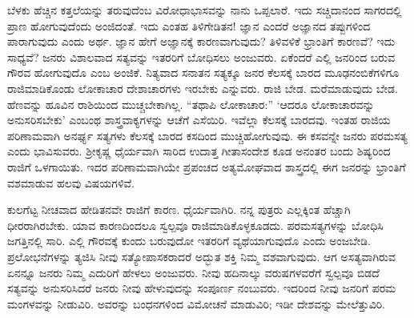 ಬೆಳಕು ಹೆಚ್ಚಿನ ಕತ್ತಲೆಯನ್ನು ತರುವುದೆಂಬ ವಿರೋಧಾಭಾಸವನ್ನು ನಾನು ಒಪ್ಪಲಾರೆ. ಇದು ಸಚ್ಚಿದಾನಂದ ಸಾಗರದಲ್ಲಿ ಪ್ರಾಣ ಹೋಗುವುದೆಂದು ಅಂಜಿದಂತೆ. ಇದು ಎಂತಹ ತಿಳಿಗೇಡಿತನ! ಜ್ಞಾನ ಎಂದರೆ ಅಜ್ಞಾನದ ತಪ್ಪುಗಳಿಂದ ಪಾರಾಗುವುದು ಎಂದು ಅರ್ಥ. ಜ್ಞಾನ ಹೇಗೆ ಅಜ್ಞಾನಕ್ಕೆ ಕಾರಣವಾಗುವುದು? ತಿಳಿವಳಿಕೆ ಭ್ರಾಂತಿಗೆ ಕಾರಣವೆ? ಇದು ಸಾಧ್ಯವೆ? ಜನರು ವಿಶಾಲವಾದ ಸತ್ಯವನ್ನು ಇತರರಿಗೆ ಬೋಧಿಸಲು ಅಂಜುವರು. ಏಕೆಂದರೆ ಎಲ್ಲಿ ಜನರಿಂದ ಬರುವ ಗೌರವ ಹೋಗುವುದೊ ಎಂಬ ಅಂಜಿಕೆ. ನಿತ್ಯವಾದ ಸನಾತನ ಸತ್ಯಕ್ಕೂ ಜನರ ಕೆಲಸಕ್ಕೆ ಬಾರದ ಮೂಢನಂಬಿಕೆಗಳಿಗೂ ರಾಜಿಮಾಡಿಕೊಂಡು ಲೋಕಾಚಾರ ದೇಶಾಚಾರಗಳು ಇರಬೇಕು ಎನ್ನುವರು. ರಾಜಿ ಬೇಡ. ಮರೆಮಾಡುವುದು ಬೇಡ. ಹೆಣವನ್ನು ಹೂವಿನ ರಾಶಿಯಿಂದ ಮುಚ್ಚಬೇಕಾಗಿಲ್ಲ. “ತಥಾಪಿ ಲೋಕಾಚಾರ:” ‘ಆದರೂ ಲೋಕಾಚಾರವನ್ನು ಅನುಸರಿಸಬೇಕು’ ಎಂಬಂಥ ಶಾಸ್ತ್ರವಾಕ್ಯಗಳನ್ನು ಆಚೆಗೆ ಎಸೆಯಿರಿ. ಇವೆಲ್ಲಾ ಕೆಲಸಕ್ಕೆ ಬಾರದವು. ಇಂತಹ ರಾಜಿಯ ಪರಿಣಾಮವಾಗಿ ಅನರ್ಘ್ಯ ಸತ್ಯಗಳು ಕೆಲಸಕ್ಕೆ ಬಾರದ ಕಸದಿಂದ ಮುಚ್ಚಿಹೋಗುವುವು. ಈ ಕಸವನ್ನೇ ಜನರು ಪರಮಸತ್ಯ ಎಂದು ಭಾವಿಸುವರು. ಶ‍್ರೀಕೃಷ್ಣ ಧೈರ್ಯವಾಗಿ ಸಾರಿದ ಉದಾತ್ತ ಗೀತಾಸಂದೇಶ ಕೂಡ ಅನಂತರ ಬಂದು ಶಿಷ್ಯರಿಂದ ರಾಜಿಗೆ ಒಳಗಾಯಿತು. ಇದರ ಪರಿಣಾಮವಾಗಿಯೇ ಪ್ರಪಂಚದ ಅತ್ಯಮೋಘವಾದ ಶಾಸ್ತ್ರದಲ್ಲಿ ಈಗ ಜನರನ್ನು ಭ್ರಾಂತಿಗೆ ವಶಮಾಡುವ ಹಲವು ವಿಷಯಗಳಿವೆ.

ಕುಲಗೆಟ್ಟ ನೀಚವಾದ ಹೇಡಿತನವೇ ರಾಜಿಗೆ ಕಾರಣ. ಧೈರ್ಯವಾಗಿರಿ. ನನ್ನ ಪುತ್ರರು ಎಲ್ಲಕ್ಕಿಂತ ಹೆಚ್ಚಾಗಿ ಧೀರರಾಗಿರಬೇಕು. ಯಾವ ಕಾರಣದಿಂದಲೂ ಸ್ವಲ್ಪವೂ ರಾಜಿಮಾಡಿಕೊಳ್ಳಕೂಡದು. ಪರಮಸತ್ಯಗಳನ್ನು ಬೋಧಿಸಿ ಜಗತ್ತಿನಲ್ಲಿ ಸಾರಿ. ಎಲ್ಲಿ ಗೌರವಕ್ಕೆ ಕುಂದು ಬರುವುದೋ ಇತರರಿಗೆ ವ್ಯಥೆಯಾಗುವುದೊ ಎಂದು ಅಂಜಬೇಡಿ. ಪ್ರಲೋಭನೆಗಳನ್ನು ತ್ಯಜಿಸಿ ನೀವು ಸತ್ಯೋಪಾಸಕರಾದರೆ ಅದ್ಭುತ ಶಕ್ತಿ ನಿಮ್ಮ ವಶವಾಗುವುದು. ಆಗ ಅಸತ್ಯವಾಗಿರುವ ಏನನ್ನೂ ಜನರು ನಿಮ್ಮ ಎದುರಿಗೆ ಹೇಳಲು ಅಂಜುವರು. ನೀವು ಹದಿನಾಲ್ಕು ವರುಷಗಳವರೆಗೆ ಸ್ವಲ್ಪವೂ ಬಿಡದೆ ಸತ್ಯವನ್ನು ಅನುಸರಿಸಿದರೆ ಜನರು ನೀವು ಹೇಳುವುದನ್ನು ಸಂಪೂರ್ಣ ನಂಬುವರು. ಇದರಿಂದ ನೀವು ಜನರಿಗೆ ಪರಮ ಮಂಗಳವನ್ನು ನೀಡುವಿರಿ. ಅವರನ್ನು ಬಂಧನಗಳಿಂದ ವಿಮೋಚನೆ ಮಾಡುವಿರಿ; ಇಡೀ ದೇಶವನ್ನು ಮೇಲೆತ್ತುವಿರಿ.

